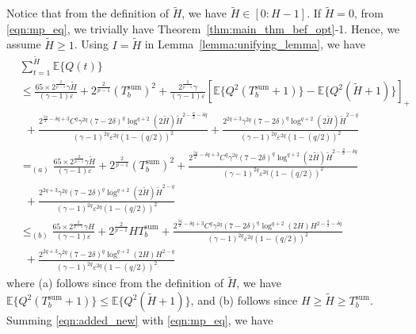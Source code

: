 \documentclass[12pt,draftcls, onecolumn]{IEEEtran}
\begin{document}
Notice that from the definition of $\tilde{H}$, we have $\tilde{H} \in [0:H-1]$. If $\tilde{H} = 0$, from \eqref{eqn:mp_eq}, we trivially have Theorem~\ref{thm:main_thm_bef_opt}-1. Hence, we assume $\tilde{H} \geq 1$. Using $I = \tilde{H}$ in Lemma~\ref{lemma:unifying_lemma}, we have
\begin{align}\label{eqn:added_new}
      &\sum_{t=1}^{\tilde{H}} \mathbb{E}\{Q(t)\} \nonumber\\ &\leq \frac{65\times 2^{\frac{2}{p-1}}\gamma \tilde{H}}{(\gamma-1) \varepsilon}+2^{\frac{2}{p-1}}(T_b^{\text{sum}})^2+\frac{2^{\frac{2}{p-1}}\gamma}{(\gamma-1)\varepsilon}\left[\mathbb{E}\{Q^2(T^{\text{sum}}_b+1)\}-\mathbb{E}\{Q^2( \tilde{H}+1)\}\right]_+ \nonumber\\&\ \   +\frac{2^{\frac{5q}{2}-\delta q+3}C^q\gamma^{2q}(7-2\delta)^q \log^{q+2}(2\tilde{H})\tilde{H}^{2-\frac{q}{2}-\delta q}}{(\gamma-1)^{2q}\varepsilon^{2q}(1-(q/2))^2} +\frac{2^{2q+3}\gamma^{2q}(7-2\delta)^q \log^{q+2}(2\tilde{H})\tilde{H}^{2-q}}{(\gamma-1)^{2q}\varepsilon^{2q}(1-(q/2))^2}\nonumber\\& =_{(a)} \frac{65\times 2^{\frac{2}{p-1}}\gamma \tilde{H}}{(\gamma-1) \varepsilon}+2^{\frac{2}{p-1}}(T_b^{\text{sum}})^2 +\frac{2^{\frac{5q}{2}-\delta q+3}C^q\gamma^{2q}(7-2\delta)^q \log^{q+2}(2\tilde{H})\tilde{H}^{2-\frac{q}{2}-\delta q}}{(\gamma-1)^{2q}\varepsilon^{2q}(1-(q/2))^2} \nonumber\\&\ \ +\frac{2^{2q+3}\gamma^{2q}(7-2\delta)^q \log^{q+2}(2\tilde{H})\tilde{H}^{2-q}}{(\gamma-1)^{2q}\varepsilon^{2q}(1-(q/2))^2}\nonumber\\& \leq_{(b)} \frac{65\times 2^{\frac{2}{p-1}}\gamma H}{(\gamma-1) \varepsilon}+2^{\frac{2}{p-1}}HT_b^{\text{sum}} +\frac{2^{\frac{5q}{2}-\delta q+3}C^q\gamma^{2q}(7-2\delta)^q \log^{q+2}(2H)H^{2-\frac{q}{2}-\delta q}}{(\gamma-1)^{2q}\varepsilon^{2q}(1-(q/2))^2} \nonumber\\&\ \ +\frac{2^{2q+3}\gamma^{2q}(7-2\delta)^q \log^{q+2}(2H)H^{2-q}}{(\gamma-1)^{2q}\varepsilon^{2q}(1-(q/2))^2}
\end{align}
where (a) follows since from the definition of $\tilde{H}$, we have $\mathbb{E}\{Q^2(T^{\text{sum}}_b+1)\}\leq \mathbb{E}\{Q^2( \tilde{H}+1)\}$, and (b) follows since $H \geq \tilde{H} \geq T^{\text{sum}}_b$.
Summing \eqref{eqn:added_new} with \eqref{eqn:mp_eq}, we have
\end{document}
